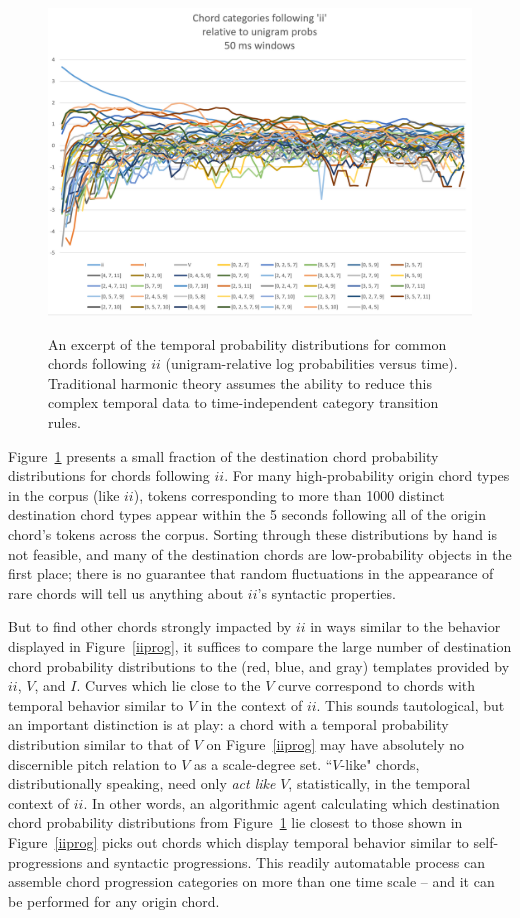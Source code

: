 \begin{figure}
	\centering
	\caption{An excerpt of the temporal probability distributions for common chords following $ii$ (unigram-relative log probabilities versus time).  Traditional harmonic theory assumes the ability to reduce this complex temporal data to time-independent category transition rules.}
	\includegraphics[width=6in]{ii_messy.png}
	\label{ii_messy}
\end{figure}

Figure~\ref{ii_messy} presents a small fraction of the destination chord probability distributions for chords following $ii$.  For many high-probability origin chord types in the corpus (like $ii$), tokens corresponding to more than 1000 distinct destination chord types appear within the 5 seconds following all of the origin chord's tokens across the corpus.  Sorting through these distributions by hand is not feasible, and many of the destination chords are low-probability objects in the first place; there is no guarantee that random fluctuations in the appearance of rare chords will tell us anything about $ii$'s syntactic properties.

But to find other chords strongly impacted by $ii$ in ways similar to the behavior displayed in Figure~\ref{iiprog}, it suffices to compare the large number of destination chord probability distributions to the (red, blue, and gray) templates provided by $ii$, $V$, and $I$.  Curves which lie close to the $V$ curve correspond to chords with temporal behavior similar to $V$ in the context of $ii$.  This sounds tautological, but an important distinction is at play: a chord with a temporal probability distribution similar to that of $V$ on Figure~\ref{iiprog} may have absolutely no discernible pitch relation to $V$ as a scale-degree set.  ``$V$-like" chords, distributionally speaking, need only \emph{act like} $V$, statistically, in the temporal context of $ii$.  In other words, an algorithmic agent calculating which destination chord probability distributions from Figure~\ref{ii_messy} lie closest to those shown in Figure~\ref{iiprog} picks out chords which display temporal behavior similar to self-progressions and syntactic progressions.  This readily automatable process can assemble chord progression categories on more than one time scale -- and it can be performed for any origin chord.

